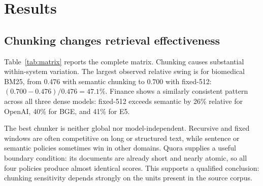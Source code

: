 \documentclass[10pt,letterpaper]{article}
\begin{document}
\section{Results}

\subsection{Chunking changes retrieval effectiveness}

Table~\ref{tab:matrix} reports the complete matrix. Chunking causes substantial within-system
variation. The largest observed relative swing is for biomedical BM25, from 0.476 with semantic
chunking to 0.700 with fixed-512:
$(0.700-0.476)/0.476=47.1\%$. Finance shows a similarly consistent pattern across all three dense
models: fixed-512 exceeds semantic by 26\% relative for OpenAI, 40\% for BGE, and 41\% for E5.

The best chunker is neither global nor model-independent. Recursive and fixed windows are often
competitive on long or structured text, while sentence or semantic policies sometimes win in other
domains. Quora supplies a useful boundary condition: its documents are already short and nearly
atomic, so all four policies produce almost identical scores. This supports a qualified conclusion:
chunking sensitivity depends strongly on the units present in the source corpus.
\end{document}
